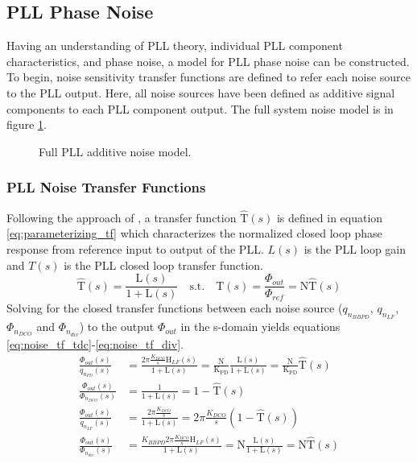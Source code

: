 \subsection{PLL Phase Noise}\label{ntfs}
	Having an understanding of PLL theory, individual PLL component characteristics, and phase noise, a model for PLL phase noise can be constructed. To begin, noise sensitivity transfer functions are defined to refer each noise source to the PLL output. Here, all noise sources have been defined as additive signal components to each PLL component output. The full system noise model is in figure \ref{fig:full_pll_noise}.
	\begin{figure}[htb!]
		\center
		\caption{Full PLL additive noise model.}
		\label{fig:full_pll_noise}
	\end{figure}
	\FloatBarrier
	\subsubsection{PLL Noise Transfer Functions}
	Following the approach of \cite{perrott_2002}, a transfer function $\hat{\mathrm{T}}(s)$ is defined in equation \ref{eq:parameterizing_tf} which characterizes the normalized closed loop phase response from reference input to output of the PLL. $L(s)$ is the PLL loop gain and $T(s)$ is the PLL closed loop transfer function. 
	\begin{equation}\label{eq:parameterizing_tf}
	\hat{\mathrm{T}}(s) = \frac{\mathrm{L}(s)}{1+\mathrm{L}(s)}\hspace{1em} \text{s.t.} \hspace{1em} \mathrm{T}(s) = \frac{\Phi_{out}}{\Phi_{ref}} = \mathrm{N}\hat{\mathrm{T}}(s) 
	\end{equation}
	Solving for the closed transfer functions between each noise source ($q_{n_{BBPD}}$, $q_{n_{LF}}$, $\Phi_{n_{DCO}}$ and $\Phi_{n_{div}}$) to the output $\Phi_{out}$ in the s-domain yields equations \ref{eq:noise_tf_tdc}-\ref{eq:noise_tf_div}.
	\begin{align}
		\frac{\Phi_{out}(s)}{q_{n_{PD}}(s)} & = \frac{2\pi\frac{K_{DCO}}{s}\mathrm{H}_{LF}(s)}{1+\mathrm{L}(s)}= \frac{\mathrm{N}}{\mathrm{K_{PD}}}\frac{\mathrm{L}(s)}{1+\mathrm{L}(s)} = \frac{\mathrm{N}}{\mathrm{K_{PD}}}\hat{\mathrm{T}}(s)\label{eq:noise_tf_tdc}\\
		\frac{\Phi_{out}(s)}{\Phi_{n_{DCO}}(s)} & = \frac{1}{1+\mathrm{L}(s)}= 1-\hat{\mathrm{T}}(s)\\
		\frac{\Phi_{out}(s)}{q_{n_{LF}}(s)} & = \frac{2\pi\frac{K_{DCO}}{s}}{1+\mathrm{L}(s)} = 2\pi\frac{K_{DCO}}{s}(1-\hat{\mathrm{T}}(s))\\
		\frac{\Phi_{out}(s)}{\Phi_{n_{div}}(s)} & =\frac{K_{BBPD} 2\pi \frac{K_{DCO}}{s}\mathrm{H}_{LF}(s)}{1+\mathrm{L}(s)}= \mathrm{N}\frac{\mathrm{L}(s)}{1+\mathrm{L}(s)} = \mathrm{N}\hat{\mathrm{T}}(s)\label{eq:noise_tf_div}
	\end{align}

